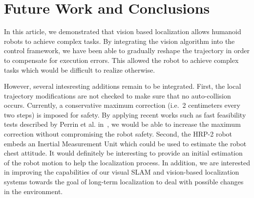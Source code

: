 \section{Future Work and Conclusions}\label{sec:conclusions}

In this article, we demonstrated that vision based localization allows
humanoid robots to achieve complex tasks. By integrating the vision
algorithm into the control framework, we have been able to gradually
reshape the trajectory in order to compensate for execution
errors. This allowed the robot to achieve complex tasks which would be
difficult to realize otherwise.

However, several intesresting additions remain to be
integrated. First, the local trajectory modifications are not checked
to make sure that no auto-collision occurs. Currently, a conservative
maximum correction (i.e.\ 2 centimeters every two steps) is imposed
for safety. By applying recent works such as fast feasibility tests
described by Perrin et al. in~\cite{Perrin10icra}, we would be able to
increase the maximum correction without compromising the robot
safety. Second, the HRP-2 robot embeds an Inertial Measurement Unit
which could be used to estimate the robot chest attitude. It would
definitely be interesting to provide an initial estimation of the
robot motion to help the localization process. In addition, we are
interested in improving the capabilities of our visual SLAM and
vision-based localization systems towards the goal of long-term
localization to deal with possible changes in the environment.


